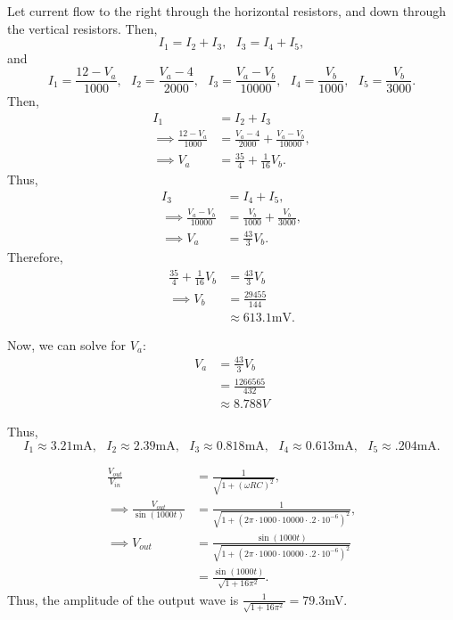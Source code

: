 \documentclass{article}
\begin{document}
\pagecolor{black}
\color{white}

Let current flow to the right through the horizontal resistors, and down through the vertical resistors.
Then, $$I_1 = I_2 + I_3, ~~~ I_3 = I_4 + I_5,$$
and $$I_{1} = \frac{12-V_{a}}{1000}, ~~~ I_{2} = \frac{V_{a}-4}{2000}, ~~~ I_{3} = \frac{V_{a}-V_{b}}{10000}, ~~~ I_{4} = \frac{V_{b}}{1000}, ~~~ I_{5} = \frac{V_{b}}{3000}.$$
Then,
\begin{align*}
    I_{1}&=I_{2}+I_{3} \\
    \implies \frac{12-V_{a}}{1000}&=\frac{V_{a}-4}{2000}+\frac{V_{a}-V_{b}}{10000}, \\
    \implies V_a &= \frac{35}4 + \frac{1}{16}V_b.
\end{align*}
Thus,
\begin{align*}
    I_3 &= I_4 + I_5, \\
    \implies \frac{V_{a}-V_{b}}{10000}&=\frac{V_{b}}{1000}+\frac{V_{b}}{3000}, \\
    \implies V_{a}&=\frac{43}{3}V_{b}.
\end{align*}
Therefore,
\begin{align*}
    \frac{35}4 + \frac{1}{16}V_b &= \frac{43}{3}V_{b} \\
    \implies V_b &= \frac{29455}{144} \\
    &\approx 613.1\text{mV}.
\end{align*}

Now, we can solve for $V_a$:
\begin{align*}
    V_a &= \frac{43}3V_b \\
        &= \frac{1266565}{432} \\
        &\approx 8.788V
\end{align*}

Thus, $$I_{1} \approx 3.21\text{mA}, ~~~ I_{2} \approx 2.39\text{mA}, ~~~ I_{3} \approx 0.818\text{mA}, ~~~ I_{4} \approx 0.613\text{mA}, ~~~ I_{5} \approx .204\text{mA}.$$

\newpage{}

\begin{align*}
    \frac{V_{out}}{V_{in}} &= \frac{1}{\sqrt{1+(\omega RC)^2}}, \\
    \implies \frac{V_{out}}{\sin\left(1000t\right)} &= \frac{1}{\sqrt{1+\left(2\pi\cdot1000\cdot10000\cdot.2\cdot10^{-6}\right)^{2}}}, \\
    \implies V_{out} &= \frac{\sin\left(1000t\right)}{\sqrt{1+\left(2\pi\cdot1000\cdot10000\cdot.2\cdot10^{-6}\right)^{2}}} \\
            &= \frac{\sin\left(1000t\right)}{\sqrt{1+16\pi^{2}}}.
\end{align*}
Thus, the amplitude of the output wave is $\frac{1}{\sqrt{1+16\pi^{2}}} = 79.3$mV.
\end{document}
